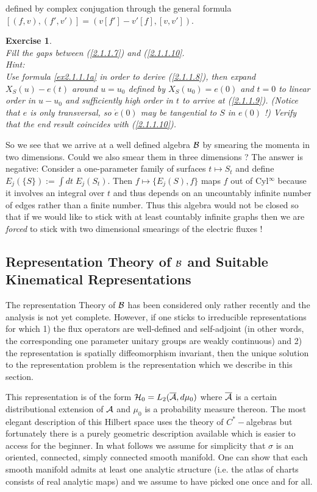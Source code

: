 \documentclass[12pt]{report}
\newtheorem{Exercise}{Exercise}[section]
\def\a{{\cal A}}
\def\ab{\overline{\a}}
\begin{document}
defined by complex conjugation through the general formula
$[(f,v),(f',v')]=(v[f']-v'[f],[v,v'])$.
%
\begin{Exercise} \label{ex2.1.1.3}  ~~~~\\
Fill the gaps between (\ref{2.1.1.7}) and (\ref{2.1.1.10}.\\
Hint:\\
Use formula \ref{ex2.1.1.1a} in order to derive (\ref{2.1.1.8}), then 
expand $X_S(u)-e(t)$ around $u=u_0$ defined by $X_S(u_0)=e(0)$ and $t=0$
to linear order in $u-u_0$ and sufficiently high order in $t$
to arrive at (\ref{2.1.1.9}). (Notice that
$e$ is only transversal, so $\dot{e}(0)$ may be tangential to $S$ in 
$e(0)$ !) Verify that the end result coincides with (\ref{2.1.1.10}).
\end{Exercise}
%
So we see that we arrive at a well defined algebra $\cal B$ by smearing 
the momenta in two dimensions. Could we also smear them in three 
dimensions ? The answer is negative: Consider a one-parameter family 
of surfaces $t\mapsto S_t$ and define $E_j(\{S\}):=\int dt\; E_j(S_t)$.
Then $f\mapsto \{E_j(S),f\}$ maps $f$ out of Cyl$^\infty$ because
it involves an integral over $t$ and thus depends on an uncountably 
infinite number of edges rather than a finite number. Thus this algebra
would not be closed so that if we would like to stick with at least
countably infinite graphs then we are {\it forced} to stick with 
two dimensional smearings of the electric fluxes ! 
 

\subsection{Representation Theory of $\cal B$ and 
Suitable Kinematical Representations}
\label{s2.1.2}

The representation Theory of $\cal B$ has been considered only rather
recently \cite{31} and the analysis is not yet complete. However, if one 
sticks to irreducible representations for which 1) the flux operators are 
well-defined and self-adjoint (in other words, the corresponding one 
parameter unitary groups are weakly continuous) and 2) the 
representation is spatially diffeomorphism invariant, then the unique
solution to the representation problem is the representation which we
describe in this section.

This representation is of the form ${\cal H}_0=L_2(\ab,d\mu_0)$ where
$\ab$ is a certain distributional extension of $\a$ and $\mu_0$
is a probability measure thereon. The most elegant description of this
Hilbert space uses the theory of $C^\ast-$algebras \cite{32} but 
fortunately there is a purely geometric description available \cite{33}
which is easier to access for the beginner. In what follows we assume 
for simplicity that $\sigma$ is an oriented, connected, simply connected
smooth manifold. One can show that each smooth manifold admits at least
one analytic structure (i.e. the atlas of charts consists of real analytic
maps) and we assume to have picked one once and for all.
\end{document}
